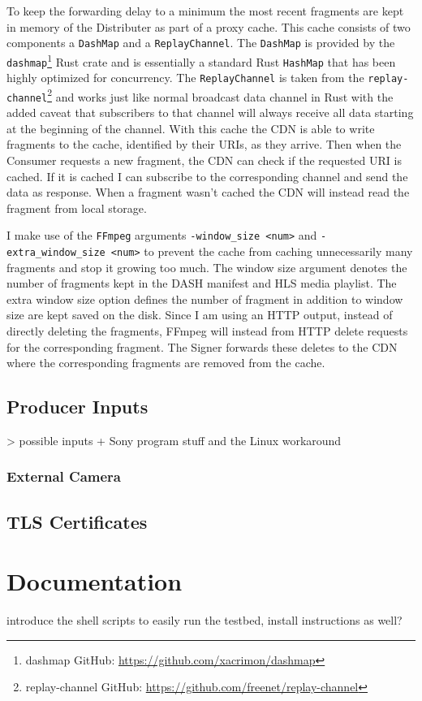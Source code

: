 To keep the forwarding delay to a minimum the most recent fragments are kept in memory of the Distributer as part of a proxy cache. This cache consists of two components a \texttt{DashMap} and a \texttt{ReplayChannel}. The \texttt{DashMap} is provided by the \texttt{dashmap}\footnote{dashmap GitHub: \url{https://github.com/xacrimon/dashmap}} Rust crate and is essentially a standard Rust \texttt{HashMap} that has been highly optimized for concurrency. The \texttt{ReplayChannel} is taken from the \texttt{replay-channel}\footnote{replay-channel GitHub: \url{https://github.com/freenet/replay-channel}} and works just like normal broadcast data channel in Rust with the added caveat that subscribers to that channel will always receive all data starting at the beginning of the channel. With this cache the CDN is able to write fragments to the cache, identified by their URIs, as they arrive. Then when the Consumer requests a new fragment, the CDN can check if the requested URI is cached. If it is cached I can subscribe to the corresponding channel and send the data as response. When a fragment wasn't cached the CDN will instead read the fragment from local storage.

I make use of the \texttt{FFmpeg} arguments \texttt{-window\_size <num>} and \texttt{-extra\_window\_size <num>} to prevent the cache from caching unnecessarily many fragments and stop it growing too much. The window size argument denotes the number of fragments kept in the DASH manifest and HLS media playlist. The extra window size option defines the number of fragment in addition to window size are kept saved on the disk. Since I am using an HTTP output, instead of directly deleting the fragments, FFmpeg will instead from HTTP delete requests for the corresponding fragment. The Signer forwards these deletes to the CDN where the corresponding fragments are removed from the cache.

\subsection{Producer Inputs\label{sec:producer_inputs}}

> possible inputs + Sony program stuff and the Linux workaround

\subsubsection{External Camera\label{sec:ext_cam}}

\subsection{TLS Certificates}


\section{Documentation\label{sec:docu}}

introduce the shell scripts to easily run the testbed, install instructions as well?
